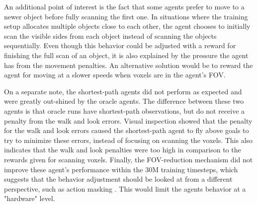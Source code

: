         
      
        An additional point of interest is the fact that some agents prefer to move to a newer object before fully scanning the first one.
        In situations where the training setup allocates multiple objects close to each other, the agent chooses to initially scan the visible sides from each object instead of scanning the objects sequentially.
        Even though this behavior could be adjusted with a reward for finishing the full scan of an object, it is also explained by the pressure the agent has from the movement penalties. 
        An alternative solution would be to reward the agent for moving at a slower speeds when voxels are in the agent's FOV.
       
    
        On a separate note, the shortest-path agents did not perform as expected and were greatly out-shined by the oracle agents. 
        The difference between these two agents is that oracle runs have shortest-path observations, but do not receive a penalty from the walk and look errors. 
        Visual inspection showed that the penalty for the walk and look errors caused the shortest-path agent to fly above goals to try to minimize these errors, instead of focusing on scanning the voxels. This also indicates that the walk and look penalties were too high in comparison to the rewards given for scanning voxels.
        Finally, the FOV-reduction mechanism did not improve these agent's performance within the 30M training timesteps, which suggests that the behavior adjustment should be looked at from a different perspective, such as action masking \cite{github-unity-mlagents-toolkit}. This would limit the agents behavior at a "hardware" level.
        
